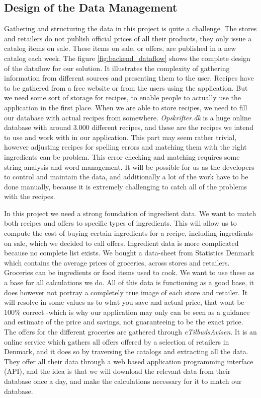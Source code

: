 \subsection{Design of the Data Management}\label{subsec:backend_datamanagement}

Gathering and structuring the data in this project is quite a challenge. The stores and retailers do not publish official prices of all their products, they only issue a catalog items on sale. These items on sale, or offers, are published in a new catalog each week. The figure \ref{fig:backend_dataflow} shows the complete design of the dataflow for our solution. It illustrates the complexity of gathering information from different sources and presenting them to the user. Recipes have to be gathered from a free website or from the users using the application. But we need some sort of storage for recipes, to enable people to actually use the application in the first place. When we are able to store recipes, we need to fill our database with actual recipes from somewhere. \textit{Opskrifter.dk} is a huge online database with around 3.000 different recipes, and these are the recipes we intend to use and work with in our application. This part may seem rather trivial, however adjusting recipes for spelling errors and matching them with the right ingredients can be problem. This error checking and matching requires some string analysis and word management. It will be possible for us as the developers to control and maintain the data, and additionally a lot of the work have to be done manually, because it is extremely challenging to catch all of the problems with the recipes.

In this project we need a strong foundation of ingredient data. We want to match both recipes and offers to specific types of ingredients. This will allow us to compute the cost of buying certain ingredients for a recipe, including ingredients on sale, which we decided to call offers. Ingredient data is more complicated because no complete list exists. We bought a data-sheet from Statistics Denmark which contains the average prices of groceries, across stores and retailers. Groceries can be ingredients or food items used to cook. We want to use these as a base for all calculations we do. All of this data is functioning as a good base, it does however not portray a completely true image of each store and retailer. It will resolve in some values as to what you save and actual price, that wont be 100\% correct -which is why our application may only can be seen as a guidance and estimate of the price and savings, not guaranteeing to be the exact price. The offers for the different groceries are gathered through \textit{eTilbudsAvisen}. It is an online service which gathers all offers offered by a selection of retailers in Denmark, and it does so by traversing the catalogs and extracting all the data. They offer all their data through a web based application programming interface (API), and the idea is that we will download the relevant data from their database once a day, and make the calculations necessary for it to match our database. 

